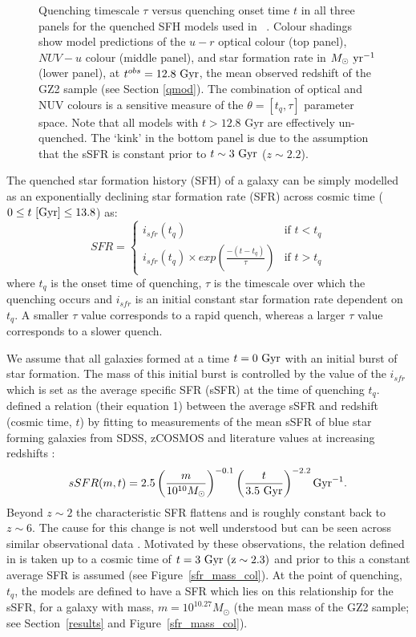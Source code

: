 \begin{figure}
\caption[Predicted colours and SFRs of quenching models]{Quenching timescale $\tau$ versus quenching onset time $t$ in all three panels for the quenched SFH models used in ~\starpy. Colour shadings show model predictions of the $u-r$ optical colour (top panel), $NUV-u$ colour (middle panel), and star formation rate in $M_\odot \rm{~yr}^{-1}$ (lower panel), at $t^{obs} = 12.8~\rm{Gyr}$, the mean observed redshift of the GZ2 sample (see Section \ref{qmod}). The combination of optical and NUV colours is a sensitive measure of the $\theta = [t_q, \tau]$ parameter space. Note that all models with $t > 12.8$ \rm{Gyr} are effectively un-quenched. The `kink' in the bottom panel is due to the assumption that the sSFR is constant prior to $t \sim 3~\rm{Gyr}$ ($z\sim 2.2$).}
\label{pred}
\end{figure}

The quenched star formation history (SFH) of a galaxy can be simply modelled as an exponentially declining star formation rate (SFR) across cosmic time ($0 \leq t ~\rm{[Gyr]} \leq 13.8$) as:
\begin{equation}\label{sfh}
SFR =
\begin{cases}
i_{sfr}(t_q) & \text{if } t < t_q \\
i_{sfr}(t_q) \times exp{\left( \frac{-(t-t_{q})}{\tau}\right)} & \text{if } t > t_q 
\end{cases}
\end{equation}
where $t_{q}$ is the onset time of quenching, $\tau$ is the timescale over which the quenching occurs and $i_{sfr}$ is an initial constant star formation rate dependent on $t_q$.  A smaller $\tau$ value corresponds to a rapid quench, whereas a larger $\tau$ value corresponds to a slower quench. 

We assume that all galaxies formed at a time $t=0~\rm{Gyr}$ with an initial burst of star formation. The mass of this initial burst is controlled by the value of the $i_{sfr}$ which is set as the average specific SFR (sSFR) at the time of quenching $t_q$.  \citet{peng10} defined a relation (their equation 1) between the average sSFR and redshift (cosmic time, $t$) by fitting to measurements of the mean sSFR of blue star forming galaxies from SDSS, zCOSMOS and literature values at increasing redshifts \citep{Elbaz07, Daddi07}:
\begin{equation}
sSFR(m,t) = 2.5 \left( \frac{m}{10^{10} M_{\odot}} \right)^{-0.1} \left(\frac{t}{3.5 ~\rm{Gyr}}\right)^{-2.2} \rm{Gyr}^{-1}.
\end{equation}
Beyond $z \sim 2$ the characteristic SFR flattens and is roughly constant back to $z\sim6$. The cause for this change is not well understood but can be seen across similar observational data \citep{peng10, gonzalez10, bethermin12}. Motivated by these observations, the relation defined in \citet{peng10} is taken up to a cosmic time of $t=3~\rm{Gyr}~(z \sim 2.3)$ and prior to this a constant average SFR is assumed (see Figure~\ref{sfr_mass_col}). At the point of quenching, $t_{q}$, the models are defined to have a SFR which lies on this relationship for the sSFR, for a galaxy with mass, $m = 10^{10.27} M_{\odot}$ (the mean mass of the GZ2 sample; see Section~\ref{results} and Figure~\ref{sfr_mass_col}).

